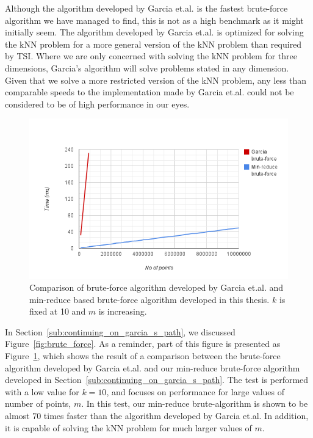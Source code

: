 Although the algorithm developed by Garcia et.al\@. is the fastest brute-force algorithm we have managed to find, this is not as a high benchmark as it might initially seem. The algorithm developed by Garcia et.al\@. is optimized for solving the kNN problem for a more general version of the kNN problem than required by TSI\@. Where we are only concerned with solving the kNN problem for three dimensions, Garcia's algorithm will solve problems stated in any dimension. Given that we solve a more restricted version of the kNN problem, any less than comparable speeds to the implementation made by Garcia et.al\@. could not be considered to be of high performance in our eyes.

\begin{figure}[ht!]
    \centering
    \includegraphics[width=120mm]{../gfx/fin-garcia-vs-min-reduce.png}
    \caption{Comparison of brute-force algorithm developed by Garcia et.al\@. and min-reduce based brute-force algorithm developed in this thesis. $k$ is fixed at 10 and $m$ is increasing.}
    \label{fig:fin-garcia-vs-min-reduce}
\end{figure}

In Section~\ref{sub:continuing_on_garcia_s_path}, we discussed Figure~\ref{fig:brute_force}. As a reminder, part of this figure is presented as Figure~\ref{fig:fin-garcia-vs-min-reduce}, which shows the result of a comparison between the brute-force algorithm developed by Garcia et.al\@. and our min-reduce brute-force algorithm developed in Section~\ref{sub:continuing_on_garcia_s_path}. The test is performed with a low value for $k=10$, and focuses on performance for large values of number of points, $m$. In this test, our min-reduce brute-algorithm is shown to be almost $70$ times faster than the algorithm developed by Garcia et.al\@. In addition, it is capable of solving the kNN problem for much larger values of $m$.


